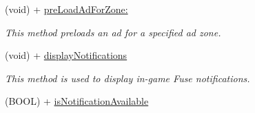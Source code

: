 \begin{DoxyCompactItemize}
(void) + \hyperlink{interface_fuse_a_p_i_a0f4ef6867a87c0a565849c96dd0f31fa}{pre\+Load\+Ad\+For\+Zone\+:}
\begin{DoxyCompactList}\small\item\em This method preloads an ad for a specified ad zone. \end{DoxyCompactList}\item 
(void) + \hyperlink{interface_fuse_a_p_i_a279e4cb8e95a3e78197761156a7de50d}{display\+Notifications}
\begin{DoxyCompactList}\small\item\em This method is used to display in-\/game Fuse notifications. \end{DoxyCompactList}\item 
\hypertarget{interface_fuse_a_p_i_a23c30bc15f208daf639ece250b8a5935}{}(B\+O\+O\+L) + \hyperlink{interface_fuse_a_p_i_a23c30bc15f208daf639ece250b8a5935}{is\+Notification\+Available}\label{interface_fuse_a_p_i_a23c30bc15f208daf639ece250b8a5935}


\end{DoxyCompactItemize}

